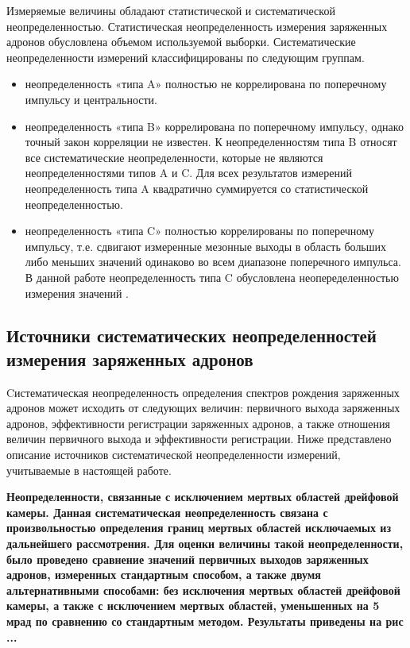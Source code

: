 Измеряемые величины обладают статистической и систематической неопределенностью. Статистическая неопределенность измерения заряженных адронов обусловлена объемом используемой выборки. %
Систематические неопределенности измерений классифицированы по следующим группам. 
\begin{itemize}
	\item неопределенность «типа A» полностью не коррелирована по поперечному импульсу и центральности. 
	\item неопределенность «типа B» коррелирована по поперечному импульсу, однако точный закон корреляции не известен. К неопределенностям типа B относят все систематические неопределенности, которые не являются неопределенностями типов A и C. Для всех результатов измерений неопределенность типа A квадратично суммируется со статистической неопределенностью.
	\item неопределенность «типа C» полностью коррелированы по поперечному импульсу, т.е. сдвигают измеренные мезонные выходы в область больших либо меньших значений одинаково во всем диапазоне поперечного импульса. В данной работе неопределенность типа C обусловлена неопеределенностью измерения значений \Ncoll.
\end{itemize}

\subsection{Источники систематических неопределенностей измерения заряженных адронов} \label{sect3:SystSource}
Cистематическая неопределенность определения спектров рождения заряженных адронов может исходить от следующих величин: первичного выхода заряженных адронов, эффективности регистрации заряженных адронов, а также отношения величин первичного выхода и эффективности регистрации. Ниже представлено описание источников систематической неопределенности измерений, учитываемые в настоящей работе. 

\bfseries Неопределенности, связанные с исключением мертвых областей дрейфовой камеры.
\mdseries
Данная систематическая неопределенность связана с произвольностью определения границ мертвых областей исключаемых из дальнейшего рассмотрения. Для оценки величины такой неопределенности, было проведено сравнение значений первичных выходов заряженных адронов, измеренных стандартным способом, а также двумя альтернативными способами: без  исключения мертвых областей дрейфовой камеры, а также с исключением мертвых областей, уменьшенных на 5 мрад по сравнению со стандартным методом. Результаты приведены на рис ...


